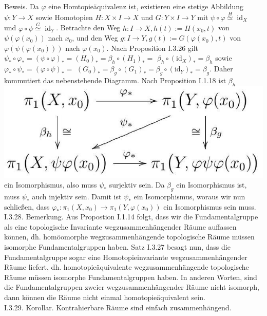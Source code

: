 \documentclass[10pt]{article}
\begin{document}
Beweis. Da $\varphi$ eine Homtopieäquivalenz ist, existieren eine stetige Abbildung $\psi: Y \rightarrow X$ sowie Homotopien $H: X \times I \rightarrow X$ und $G: Y \times I \rightarrow Y$ mit $\psi \circ \varphi \stackrel{H}{\simeq} \operatorname{id}_{X}$ und $\varphi \circ \psi \stackrel{G}{\simeq} \operatorname{id}_{Y}$. Betrachte den Weg $h: I \rightarrow X, h(t):=H\left(x_{0}, t\right)$ von $\psi\left(\varphi\left(x_{0}\right)\right)$ nach $x_{0}$, und den Weg $g: I \rightarrow Y, g(t):=G\left(\varphi\left(x_{0}\right), t\right)$ von $\varphi\left(\psi\left(\varphi\left(x_{0}\right)\right)\right)$ nach $\varphi\left(x_{0}\right)$. Nach Proposition I.3.26 gilt $\psi_{*} \circ \varphi_{*}=(\psi \circ \varphi)_{*}=\left(H_{0}\right)_{*}=\beta_{h} \circ\left(H_{1}\right)_{*}=$ $\beta_{h} \circ\left(\mathrm{id}_{X}\right)_{*}=\beta_{h}$ sowie $\varphi_{*} \circ \psi_{*}=(\varphi \circ \psi)_{*}=$ $\left(G_{0}\right)_{*}=\beta_{g} \circ\left(G_{1}\right)_{*}=\beta_{g} \circ\left(\mathrm{id}_{Y}\right)_{*}=\beta_{g}$. Daher kommutiert das nebenstehende Diagramm. Nach Proposition I.1.18 ist $\beta_{h}$\\
\includegraphics[max width=\textwidth]{2025_06_05_d7ed2bacd1e9ce1db1f0g-030} ein Isomorphismus, also muss $\psi_{*}$ surjektiv sein. Da $\beta_{g}$ ein Isomorphismus ist, muss $\psi_{*}$ auch injektiv sein. Damit ist $\psi_{*}$ ein Isomorphismus, woraus wir nun schließen, dass $\varphi_{*}: \pi_{1}\left(X, x_{0}\right) \rightarrow \pi_{1}\left(Y, \varphi\left(x_{0}\right)\right)$ ein Isomorphismus sein muss.\\
I.3.28. Bemerkung. Aus Propostion I.1.14 folgt, dass wir die Fundamentalgruppe als eine topologische Invariante wegzusammenhängender Räume auffassen können, dh. homöomorphe wegzusammenhängende topologische Räume müssen isomorphe Fundamentalgruppen haben. Satz I.3.27 besagt nun, dass die Fundamentalgruppe sogar eine Homotopieinvariante wegzusammenhängender Räume liefert, dh. homotopieäquivalente wegzusammenhängende topologische Räume müssen isomorphe Fundamentalgruppen haben. In anderen Worten, sind die Fundamentalgruppen zweier wegzusammenhängender Räume nicht isomorph, dann können die Räume nicht einmal homotopieäquivalent sein.\\
I.3.29. Korollar. Kontrahierbare Räume sind einfach zusammenhängend.
\end{document}
